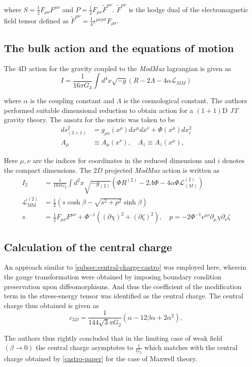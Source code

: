 where $S=\frac{1}{2}F_{\mu\nu}F^{\mu\nu}$ and $P=\frac{1}{2}F_{\mu\nu}\tilde{F}^{\mu\nu}$. $\tilde{F}^{\mu\nu}$ is the hodge dual of the electromagnetic field tensor defined as $\tilde{F}^{\mu\nu} = \frac{1}{4}\epsilon^{\mu\nu\rho\sigma}F_{\rho\sigma}$.


\subsection{The bulk action and the equations of motion}
The 4D action for the gravity coupled to the \textit{ModMax} lagrangian is given as 
\begin{equation}
    I = \frac{1}{16\pi G_4}\int d^4x\sqrt{-g}\left(R - 2\Lambda - 4\alpha\mathcal{L}_{MM}\right)
\end{equation}

where $\alpha$ is the coupling constant and $\Lambda$ is the cosmological constant. The authors performed suitable dimensional reduction to obtain action for a $\left( 1+1 \right)$D \textit{JT} gravity theory. The ansatz for the metric was taken to be 
\begin{align}
    ds_{(3+1)}^2 &= g_{\mu\nu}(x^\rho)dx^\mu dx^\nu + \Phi(x^\mu)dx_i^2 \\
    A_\mu &\equiv A_\mu(x^\nu), \quad A_z \equiv A_z(x^\mu),
\end{align}

Here $\mu, \nu$ are the indices for coordinates in the reduced dimensions and $i$ denotes the compact dimensions. The $2D$ projected \textit{ModMax} action is written as 
\begin{align}
    I_2 &= \frac{1}{16\pi G_2}\int d^2x\sqrt{-g_{(2)}}\left(\Phi R^{(2)} - 2\Lambda\Phi - 4\alpha\Phi\mathcal{L}_{(M)}^{(2)}\right) \\ 
    \mathcal{L}_{\text{MM}}^{(2)} &= \frac{1}{2}\left(s\cosh\beta - \sqrt{s^2 + p^2}\sinh\beta\right) \\
    s &= \frac{1}{2}F_{\mu\nu}F^{\mu\nu} + \Phi^{-1}\left((\partial\chi)^2 + (\partial\zeta)^2\right), \quad p = -2\Phi^{-1}\epsilon^{\mu\nu}\partial_\mu\chi\partial_\nu\zeta
\end{align}

\subsection{Calculation of the central charge}
An approach similar to \ref{subsec:central-charge-castro} was employed here, wherein the gauge transformation were obtained by imposing boundary condition preservation upon diffeomorphisms. And thus the coefficient of the modification term in the stress-energy tensor was identified as the central charge. The central charge thus obtained is given as
\begin{equation}
c_{3D} = \frac{1}{144\sqrt{3}\pi G_2}\left(\alpha - 12\beta\alpha + 2\alpha^2\right),
\end{equation}

The authors thus rightly concluded that in the limiting case of weak field $\left( \beta\to 0 \right) $ the central charge asymptotes to $\displaystyle\frac{1}{G_2}$ which matches with the central charge obtained by \ref{castro-paper} for the case of Maxwell theory.


